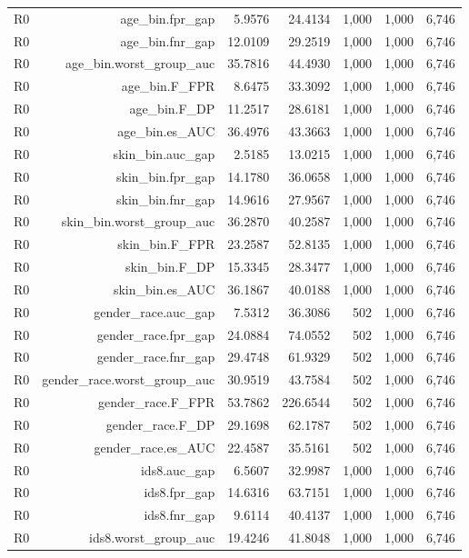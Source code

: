 \documentclass[10pt]{article}
\begin{document}
\begin{longtable}{@{}lrrrrrr@{}}
R0 & age\_bin.fpr\_gap & 5.9576 & 24.4134 & 1,000 & 1,000 & 6,746 \\
R0 & age\_bin.fnr\_gap & 12.0109 & 29.2519 & 1,000 & 1,000 & 6,746 \\
R0 & age\_bin.worst\_group\_auc & 35.7816 & 44.4930 & 1,000 & 1,000 & 6,746 \\
R0 & age\_bin.F\_FPR & 8.6475 & 33.3092 & 1,000 & 1,000 & 6,746 \\
R0 & age\_bin.F\_DP & 11.2517 & 28.6181 & 1,000 & 1,000 & 6,746 \\
R0 & age\_bin.es\_AUC & 36.4976 & 43.3663 & 1,000 & 1,000 & 6,746 \\
R0 & skin\_bin.auc\_gap & 2.5185 & 13.0215 & 1,000 & 1,000 & 6,746 \\
R0 & skin\_bin.fpr\_gap & 14.1780 & 36.0658 & 1,000 & 1,000 & 6,746 \\
R0 & skin\_bin.fnr\_gap & 14.9616 & 27.9567 & 1,000 & 1,000 & 6,746 \\
R0 & skin\_bin.worst\_group\_auc & 36.2870 & 40.2587 & 1,000 & 1,000 & 6,746 \\
R0 & skin\_bin.F\_FPR & 23.2587 & 52.8135 & 1,000 & 1,000 & 6,746 \\
R0 & skin\_bin.F\_DP & 15.3345 & 28.3477 & 1,000 & 1,000 & 6,746 \\
R0 & skin\_bin.es\_AUC & 36.1867 & 40.0188 & 1,000 & 1,000 & 6,746 \\
R0 & gender\_race.auc\_gap & 7.5312 & 36.3086 & 502 & 1,000 & 6,746 \\
R0 & gender\_race.fpr\_gap & 24.0884 & 74.0552 & 502 & 1,000 & 6,746 \\
R0 & gender\_race.fnr\_gap & 29.4748 & 61.9329 & 502 & 1,000 & 6,746 \\
R0 & gender\_race.worst\_group\_auc & 30.9519 & 43.7584 & 502 & 1,000 & 6,746 \\
R0 & gender\_race.F\_FPR & 53.7862 & 226.6544 & 502 & 1,000 & 6,746 \\
R0 & gender\_race.F\_DP & 29.1698 & 62.1787 & 502 & 1,000 & 6,746 \\
R0 & gender\_race.es\_AUC & 22.4587 & 35.5161 & 502 & 1,000 & 6,746 \\
R0 & ids8.auc\_gap & 6.5607 & 32.9987 & 1,000 & 1,000 & 6,746 \\
R0 & ids8.fpr\_gap & 14.6316 & 63.7151 & 1,000 & 1,000 & 6,746 \\
R0 & ids8.fnr\_gap & 9.6114 & 40.4137 & 1,000 & 1,000 & 6,746 \\
R0 & ids8.worst\_group\_auc & 19.4246 & 41.8048 & 1,000 & 1,000 & 6,746 \\

\end{longtable}
\end{document}
